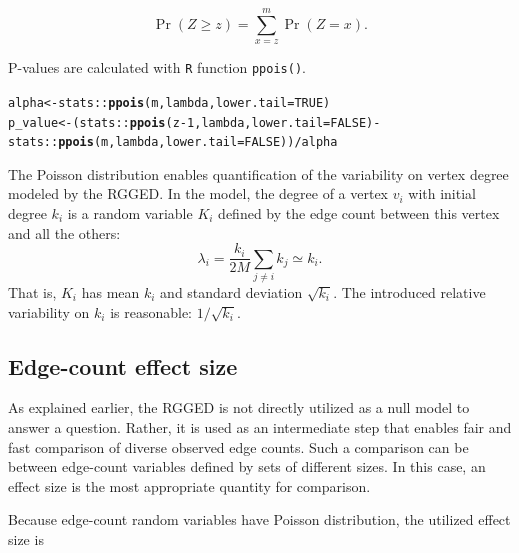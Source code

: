 \documentclass{article}\usepackage[]{graphicx}\usepackage[]{xcolor}
\makeatletter
\newcommand{\hlnum}[1]{\textcolor[rgb]{0.686,0.059,0.569}{#1}}%
\newcommand{\hlopt}[1]{\textcolor[rgb]{0,0,0}{#1}}%
\newcommand{\hldef}[1]{\textcolor[rgb]{0.345,0.345,0.345}{#1}}%
\newcommand{\hlkwb}[1]{\textcolor[rgb]{0.69,0.353,0.396}{#1}}%
\newcommand{\hlkwc}[1]{\textcolor[rgb]{0.333,0.667,0.333}{#1}}%
\newcommand{\hlkwd}[1]{\textcolor[rgb]{0.737,0.353,0.396}{\textbf{#1}}}%
\newenvironment{kframe}{%
 \def\at@end@of@kframe{}%
 \ifinner\ifhmode%
  \def\at@end@of@kframe{\end{minipage}}%
  \begin{minipage}{\columnwidth}%
 \fi\fi%
 \def\FrameCommand##1{\hskip\@totalleftmargin \hskip-\fboxsep
 \colorbox{shadecolor}{##1}\hskip-\fboxsep
     \hskip-\linewidth \hskip-\@totalleftmargin \hskip\columnwidth}%
 \MakeFramed {\advance\hsize-\width
   \@totalleftmargin\z@ \linewidth\hsize
   \@setminipage}}%
 {\par\unskip\endMakeFramed%
 \at@end@of@kframe}
\newenvironment{knitrout}{}{} %
\makeatother
\begin{document}
\begin{equation}
\Pr\left( Z \geq z \right) = \sum_{x=z}^{m} \Pr \left( Z = x\right).
\end{equation}

P-values are calculated with \texttt{R} function \texttt{ppois()}.

\begin{knitrout}
\color{fgcolor}\begin{kframe}
\begin{alltt}
\hldef{alpha} \hlkwb{<-} \hldef{stats}\hlopt{::}\hlkwd{ppois}\hldef{(m, lambda,} \hlkwc{lower.tail} \hldef{=} \hlnum{TRUE}\hldef{)}
\hldef{p_value} \hlkwb{<-} \hldef{(stats}\hlopt{::}\hlkwd{ppois}\hldef{(z} \hlopt{-} \hlnum{1}\hldef{, lambda,} \hlkwc{lower.tail} \hldef{=} \hlnum{FALSE}\hldef{)} \hlopt{-}
              \hldef{stats}\hlopt{::}\hlkwd{ppois}\hldef{(m, lambda,} \hlkwc{lower.tail} \hldef{=} \hlnum{FALSE}\hldef{))} \hlopt{/} \hldef{alpha}
\end{alltt}
\end{kframe}
\end{knitrout}

The Poisson distribution enables quantification of the variability on vertex degree modeled by the RGGED. In the model, the degree of a vertex $v_i$ with initial degree $k_i$ is a random variable $K_i$ defined by the edge count between this vertex and all the others:
\begin{equation}
\lambda_i = \frac{k_i}{2M}\sum_{j\neq i}k_j \simeq k_i.
\end{equation}
That is, $K_i$ has mean $k_i$ and standard deviation $\sqrt{k_i}$. The introduced relative variability on $k_i$ is reasonable: $1/\sqrt{k_i}$.

\subsection{Edge-count effect size}

As explained earlier, the RGGED is not directly utilized as a null model to answer a question. Rather, it is used as an intermediate step that enables fair and fast comparison of diverse observed edge counts. Such a comparison can be between edge-count variables defined by sets of different sizes. In this case, an effect size is the most appropriate quantity for comparison.

Because edge-count random variables have Poisson distribution, the utilized effect size is
\end{document}
